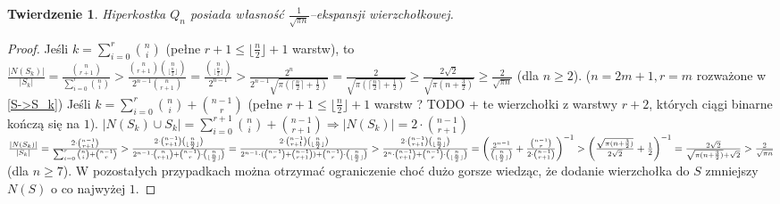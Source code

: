 \documentclass{pracamgr}
\newtheorem{theorem}{Twierdzenie}
\begin{document}
   \begin{theorem}\label{ekspansja kostki}%
    Hiperkostka $Q_n$ posiada własność $\frac{1}{\sqrt{\pi n}}$--ekspansji wierzchołkowej.
   \end{theorem}
   \begin{proof}
    Jeśli $k=\sum_{i=0}^{r}{n\choose i}$ (pełne $r+1\le\lfloor\frac{n}{2}\rfloor+1$ warstw), to%
    $\frac{|N(S_k)|}{|S_k|}=\frac{{n\choose r+1}}{\sum_{i=0}^{r}{n \choose i}}>\frac{{n\choose r+1}{n\choose \lfloor\frac{n}{2}\rfloor}}{2^{n-1}{n\choose r+1}}
    =\frac{{n\choose \lfloor\frac{n}{2}\rfloor}}{2^{n-1}}>\frac{2^{n}}{2^{n-1}\sqrt{\pi (\lceil\frac{n}{2}\rceil+\frac{1}{2})}}=
    \frac{2}{\sqrt{\pi (\lceil\frac{n}{2}\rceil+\frac{1}{2})}}
    \ge\frac{2\sqrt{2}}{\sqrt{\pi (n+\frac{3}{2})}}\ge\frac{2}{\sqrt{\pi n}}$ (dla $n\ge2$).\newline
    ($n=2m+1,r=m$ rozważone w \ref{S->S_k})\newline
    Jeśli $k=\sum_{i=0}^{r}{n\choose i}+{n-1 \choose r}$
    (pełne $r+1\le\lfloor\frac{n}{2}\rfloor+1$ warstw ? TODO + te wierzchołki z warstwy $r+2$, których ciągi binarne kończą się na $1$).\newline
    $|N(S_k)\cup S_k|=\sum_{i=0}^{r+1}{n\choose i}+{n-1 \choose r+1}\Rightarrow |N(S_k)|=2\cdot{n-1\choose r+1}$\newline
    $\frac{|N(S_k)|}{|S_k|}=\frac{2\cdot{n-1 \choose r+1}}{\sum_{i=0}^{r}{n\choose i}+{n-1 \choose r}}>
    \frac{2\cdot{n-1\choose r+1}{n\choose\lfloor\frac{n}{2}\rfloor}}{2^{n-1}\cdot{n\choose r+1}+{n-1\choose r}\cdot{n\choose\lfloor\frac{n}{2}\rfloor}}=
    \frac{2\cdot{n-1\choose r+1}{n\choose\lfloor\frac{n}{2}\rfloor}}{2^{n-1}\cdot({n-1\choose r}+{n-1\choose r+1})+{n-1\choose r}\cdot{n\choose\lfloor\frac{n}{2}\rfloor}}>\newline
    \frac{2\cdot{n-1\choose r+1}{n\choose\lfloor\frac{n}{2}\rfloor}}{2^{n}\cdot{n-1\choose r+1}+{n-1\choose r}\cdot{n\choose\lfloor\frac{n}{2}\rfloor}}=
    \left(\frac{2^{n-1}}{{n\choose\lfloor\frac{n}{2}\rfloor}}+\frac{{n-1\choose r}}{2\cdot{n-1\choose r+1}}\right)^{-1}>
    \left(\frac{\sqrt{\pi(n+\frac{3}{2})}}{2\sqrt{2}}+\frac{1}{2}\right)^{-1}=\frac{2\sqrt{2}}{\sqrt{\pi(n+\frac{3}{2})}+\sqrt{2}}>\frac{2}{\sqrt{\pi n}}$ (dla $n\ge 7$).\newline
    W pozostałych przypadkach można otrzymać ograniczenie choć dużo gorsze wiedząc, że dodanie wierzchołka do $S$ zmniejszy $N(S)$ o co najwyżej $1$.\newline

\end{proof}
\end{document}
